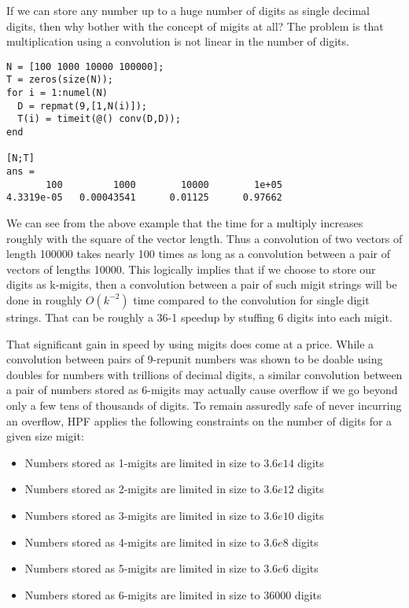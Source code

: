 \documentclass[a4paper,12pt]{article}
\begin{document}
If we can store any number up to a huge number of digits as single decimal digits, then why bother with the concept of migits at all? The problem is that multiplication using a convolution is not linear in the number of digits.

\begin{lstlisting}
N = [100 1000 10000 100000];
T = zeros(size(N));
for i = 1:numel(N)
  D = repmat(9,[1,N(i)]);
  T(i) = timeit(@() conv(D,D));
end

[N;T]
ans =
       100         1000        10000        1e+05
4.3319e-05   0.00043541      0.01125      0.97662
\end{lstlisting}

We can see from the above example that the time for a multiply increases roughly with the square of the vector length. Thus a convolution of two vectors of length 100000 takes nearly 100 times as long as a convolution between a pair of vectors of lengths 10000. This logically implies that if we choose to store our digits as k-migits, then a convolution between a pair of such migit strings will be done in roughly $O(k^{-2})$ time compared to the convolution for single digit strings. That can be roughly a 36-1 speedup by stuffing 6 digits into each migit.

That significant gain in speed by using migits does come at a price. While a convolution between pairs of 9-repunit numbers was shown to be doable using doubles for numbers with trillions of decimal digits, a similar convolution between a pair of numbers stored as 6-migits may actually cause overflow if we go beyond only a few tens of thousands of digits. To remain assuredly safe of never incurring an overflow, HPF applies the following constraints on the number of digits for a given size migit:

\begin{itemize}
  \item{Numbers stored as 1-migits are limited in size to $3.6e14$ digits}
  \item{Numbers stored as 2-migits are limited in size to $3.6e12$ digits}
  \item{Numbers stored as 3-migits are limited in size to $3.6e10$ digits}
  \item{Numbers stored as 4-migits are limited in size to $3.6e8$ digits}
  \item{Numbers stored as 5-migits are limited in size to $3.6e6$ digits}
  \item{Numbers stored as 6-migits are limited in size to $36000$ digits}
\end{itemize}
\end{document}
